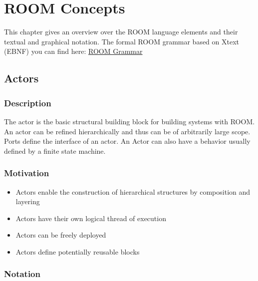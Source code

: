\chapter{ROOM Concepts}

This chapter gives an overview over the ROOM language elements and their textual and graphical notation.
The formal ROOM grammar based on Xtext (EBNF) you can find here: 
\href{http://git.eclipse.org/c/etrice/org.eclipse.etrice.git/tree/plugins/org.eclipse.etrice.core.room/src/o
rg/eclipse/etrice/core/Room.xtext}{ROOM Grammar}

\section{Actors}

\subsection{Description}
 
The actor is the basic structural building block for building systems with ROOM. An actor can be refined 
hierarchically and thus can be of arbitrarily large scope. Ports define the interface of an actor. An 
Actor can also have a behavior usually defined by a finite state machine.

\subsection{Motivation}

\begin{itemize}
\item Actors enable the construction of hierarchical structures by composition and layering
\item Actors have their own logical thread of execution
\item Actors can be freely deployed
\item Actors define potentially reusable blocks
\end{itemize}

\subsection{Notation}


